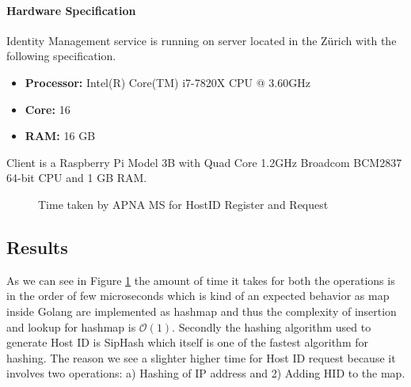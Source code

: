\paragraph{Hardware Specification}
Identity Management service is running on server located in the Z\"urich with the following specification.
\begin{itemize}
    \item \textbf{Processor:} Intel(R) Core(TM) i7-7820X CPU @ 3.60GHz
    \item \textbf{Core:} 16
    \item \textbf{RAM:} 16 GB
\end{itemize}
Client is a Raspberry Pi Model 3B with Quad Core 1.2GHz Broadcom BCM2837 64-bit CPU and 1 GB RAM.

\begin{figure}[th!!]
\centering
\noindent
{}
\decoRule
\caption[HostID Operations]{Time taken by APNA MS for HostID Register and Request}
\label{fig:perf_hid}
\end{figure}

\subsection{Results}
As we can see in Figure \ref{fig:perf_hid} the amount of time it takes for both the operations is in the order of few microseconds which is kind of an expected behavior as map inside Golang are implemented as hashmap and thus the complexity of insertion and lookup for hashmap is $\mathcal{O}(1)$. Secondly the hashing algorithm used to generate Host ID is SipHash \cite{siphash} which itself is one of the fastest algorithm for hashing. The reason we see a slighter higher time for Host ID request because it involves two operations: a) Hashing of IP address and 2) Adding HID to the map.


